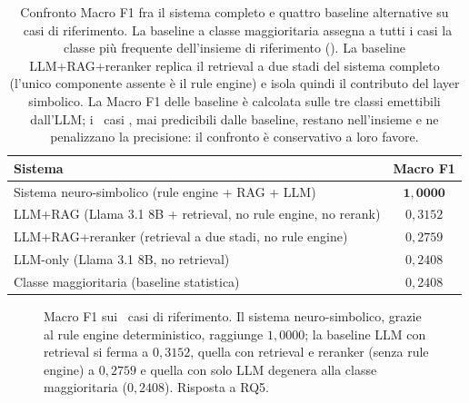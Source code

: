 \begin{table}[t]
  \centering
  \caption{Confronto Macro F1 fra il sistema completo e quattro baseline alternative su \goldn\ casi di riferimento. La baseline a classe maggioritaria assegna a tutti i casi la classe più frequente dell'insieme di riferimento (). La baseline LLM+RAG+reranker replica il retrieval a due stadi del sistema completo (l'unico componente assente è il rule engine) e isola quindi il contributo del layer simbolico. La Macro F1 delle baseline è calcolata sulle tre classi emettibili dall'LLM; i \goldRouted\ casi , mai predicibili dalle baseline, restano nell'insieme e ne penalizzano la precisione: il confronto è conservativo a loro favore.}
  \label{tab:baselines}
  \small
  \begin{tabular}{lc}
    \toprule
    Sistema & Macro F1 \\
    \midrule
    Sistema neuro-simbolico (rule engine + RAG + LLM) & $\mathbf{1{,}0000}$ \\
    LLM+RAG (Llama 3.1 8B + retrieval, no rule engine, no rerank) & $0{,}3152$ \\
    LLM+RAG+reranker (retrieval a due stadi, no rule engine) & $0{,}2759$ \\
    LLM-only (Llama 3.1 8B, no retrieval) & $0{,}2408$ \\
    Classe maggioritaria (baseline statistica) & $0{,}2408$ \\
    \bottomrule
  \end{tabular}
\end{table}

\begin{figure}[t]
  \centering
  \caption{Macro F1 sui \goldn\ casi di riferimento. Il sistema neuro-simbolico, grazie al rule engine deterministico, raggiunge $1{,}0000$; la baseline LLM con retrieval si ferma a $0{,}3152$, quella con retrieval e reranker (senza rule engine) a $0{,}2759$ e quella con solo LLM degenera alla classe maggioritaria ($0{,}2408$). Risposta a RQ5.}
  \label{fig:baseline-bar}
\end{figure}

